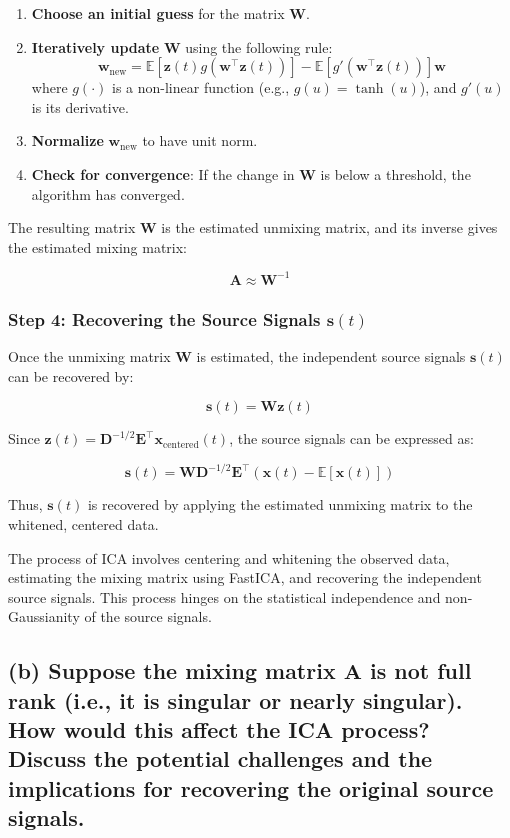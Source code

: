 \documentclass{exam}
\begin{document}
\begin{enumerate}
    \item\textbf{Choose an initial guess} for the matrix \( \mathbf{W} \).
    \item \textbf{Iteratively update} \( \mathbf{W} \) using the following rule:
    \[
    \mathbf{w}_{\text{new}} = \mathbb{E}[\mathbf{z}(t) g(\mathbf{w}^\top \mathbf{z}(t))] - \mathbb{E}[g'(\mathbf{w}^\top \mathbf{z}(t))] \mathbf{w}
    \]
    where \( g(\cdot) \) is a non-linear function (e.g., \( g(u) = \tanh(u) \)), and \( g'(u) \) is its derivative.
    \item \textbf{Normalize} \( \mathbf{w}_{\text{new}} \) to have unit norm.
    \item \textbf{Check for convergence}: If the change in \( \mathbf{W} \) is below a threshold, the algorithm has converged.
\end{enumerate}

The resulting matrix \( \mathbf{W} \) is the estimated unmixing matrix, and its inverse gives the estimated mixing matrix:

\[
\mathbf{A} \approx \mathbf{W}^{-1}
\]

\subsubsection{Step 4: Recovering the Source Signals \(\mathbf{s}(t)\)}

Once the unmixing matrix \( \mathbf{W} \) is estimated, the independent source signals \( \mathbf{s}(t) \) can be recovered by:

\[
\mathbf{s}(t) = \mathbf{W} \mathbf{z}(t)
\]

Since \( \mathbf{z}(t) = \mathbf{D}^{-1/2} \mathbf{E}^\top \mathbf{x}_{\text{centered}}(t) \), the source signals can be expressed as:

\[
\mathbf{s}(t) = \mathbf{W} \mathbf{D}^{-1/2} \mathbf{E}^\top \left(\mathbf{x}(t) - \mathbb{E}[\mathbf{x}(t)]\right)
\]

Thus, \( \mathbf{s}(t) \) is recovered by applying the estimated unmixing matrix to the whitened, centered data.

The process of ICA involves centering and whitening the observed data, estimating the mixing matrix using FastICA, and recovering the independent source signals. This process hinges on the statistical independence and non-Gaussianity of the source signals.

\subsection{(b) Suppose the mixing matrix \(\mathbf{A}\) is not full rank (i.e., it is singular or nearly singular). How would this affect the ICA process? Discuss the potential challenges and the implications for recovering the original source signals.}
\end{document}
